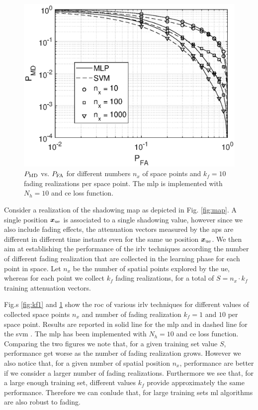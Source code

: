 \documentclass[draftcls,onecolumn,12pt]{IEEEtran}
\begin{document}
\begin{figure}[t]
    \centering
    \includegraphics[width=0.6\columnwidth]{res_avg_nTrain_kf10.eps}
    \caption{$P_{\rm MD}$ vs. $P_{\rm FA}$ for different numbers $n_x$ of space points and $k_f=10$ fading realizations per space point. The \ac{mlp} is implemented with $N_h = 10$ and \ac{ce} loss function.}
    \label{fig:kf10}
\end{figure}

Consider a realization of the shadowing map as depicted in Fig. \ref{fig:map}. A single position $\bm{x}_{\rm ue}$ is associated to a single shadowing value, however since we also include fading effects, the attenuation vectors measured by the \acp{ap} are different in different time instants even for the same \ac{ue} position $\bm{x}_{\rm ue}$. We then aim at establishing the performance of the \ac{irlv} techniques according the number of different fading realization that are collected in the learning phase for each point in space. Let $n_x$ be the number of spatial points explored by the \ac{ue}, whereas for each point we collect $k_f$ fading realizations, for a total of $S = n_x \cdot k_f$ training attenuation vectors. 

Fig.s \ref{fig:kf1} and \ref{fig:kf10} show the \ac{roc} of various \ac{irlv} techniques for different values of collected space points $n_x$ and number of fading realization $k_f = 1$ and $10$ per space point. Results are reported in solid line for the \ac{mlp} and in dashed line for the \ac{svm} . The \ac{mlp} has been implemented with $N_h=10$ and \ac{ce} loss function.  Comparing the two figures we note that, for a given training set value $S$, performance get worse as the number of fading realization grows. However we also notice that, for a given number of spatial position $n_x$, performance are better if we consider a larger number of fading realizations. Furthermore we see that, for a large enough training set,  different values $k_f$ provide approximately the same performance.  Therefore we can conlude that, for large training sets \ac{ml} algorithms are also robust to fading. 
\end{document}
